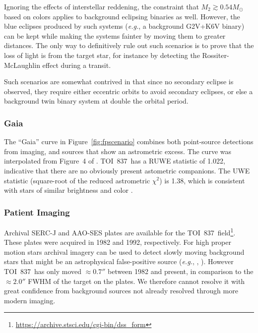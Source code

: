 \documentclass[12pt,twocolumn,tighten]{aastex63}
\newcommand{\tn}{TOI~837} %
\begin{document}
Ignoring the effects of interstellar reddening,
the constraint that $M_2 \gtrsim 0.54 M_\odot$ based on
colors applies to background eclipsing binaries as well.
However, the blue eclipses produced by such systems ({\it e.g.}, a background G2V+K6V binary)
can be kept while making the systems fainter by moving them to greater
distances.
The only way to definitively rule out such scenarios is to 
prove that the loss of light is from the target star,
for instance by detecting the Rossiter-McLaughlin effect
during a transit.

Such scenarios are somewhat contrived in that since 
no secondary eclipse is observed, they require either
eccentric orbits to avoid secondary eclipses, or else a
background twin binary system at double
the orbital period.

\subsubsection{Gaia}

The ``Gaia'' curve in Figure~\ref{fig:fpscenario} combines both
point-source detections from imaging, and sources that show an
astrometric excess.  The curve was interpolated from Figure~4 of
\citet{rizzuto_zeitVIII_2018}.  \tn\ has a RUWE statistic of 1.022,
indicative that there are no obviously present astometric companions.
The UWE statistic (square-root of the reduced astrometric $\chi^2$) is
1.38, which is consistent with stars of similar brightness and color
\citep[][Appendix A]{lindegren_gaiasoln_2018}.

%


\subsubsection{Patient Imaging}

Archival SERC-J and AAO-SES plates are available for the \tn\
field\footnote{\url{https://archive.stsci.edu/cgi-bin/dss_form}}.
These plates were acquired in 1982 and 1992, respectively.  For high
proper motion stars archival imagery can be used to detect slowly
moving background stars that might be an astrophysical false-positive
source ({\it e.g.}, \citealt{huang_pimen_2018},
\citealt{vanderburg_hr858_2019}).  However \tn\ has only moved
$\approx0.7''$ between 1982 and present, in comparison to the
$\approx2.0''$ FWHM of the target on the plates.  We therefore cannot
resolve it with great confidence from background sources not already
resolved through more modern imaging.
\end{document}
